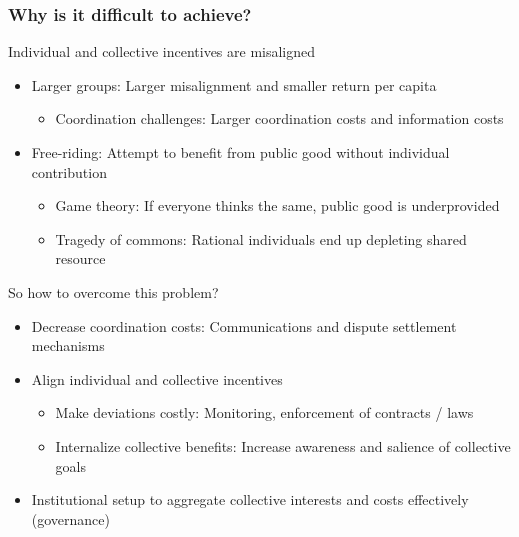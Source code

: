 \documentclass[aspectratio=169]{beamer}
\begin{document}
\begin{frame}
\frametitle{Why is it difficult to achieve?} 
Individual and collective incentives are misaligned
\begin{itemize}\setlength\itemsep{3pt}
\item Larger groups: Larger misalignment and smaller return per capita
\begin{itemize}
\item Coordination challenges: Larger coordination costs and information costs
\end{itemize}
\item Free-riding: Attempt to benefit from public good without individual contribution
\begin{itemize}\setlength\itemsep{3pt}
\item Game theory: If everyone thinks the same, public good is underprovided
\item Tragedy of commons: Rational individuals end up depleting shared resource
\end{itemize}
\end{itemize}\medskip
So how to overcome this problem?
\begin{itemize}\setlength\itemsep{3pt}
\item Decrease coordination costs: Communications and dispute settlement mechanisms
\item Align individual and collective incentives
\begin{itemize}\setlength\itemsep{3pt}
\item Make deviations costly: Monitoring, enforcement of contracts / laws
\item Internalize collective benefits: Increase awareness and salience of collective goals
\end{itemize}
\item Institutional setup to aggregate collective interests and costs effectively (governance)
\end{itemize}
\end{frame}
\end{document}
